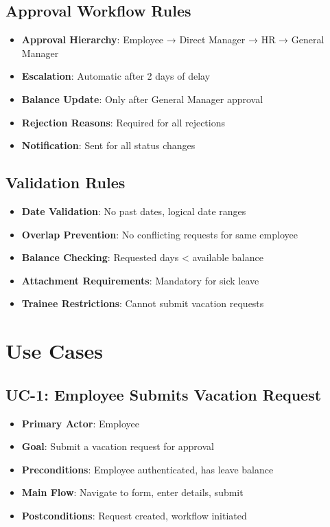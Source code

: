 \documentclass[12pt,a4paper]{article}
\begin{document}
\subsection{Approval Workflow Rules}
\begin{itemize}
    \item \textbf{Approval Hierarchy}: Employee → Direct Manager → HR → General Manager
    \item \textbf{Escalation}: Automatic after 2 days of delay
    \item \textbf{Balance Update}: Only after General Manager approval
    \item \textbf{Rejection Reasons}: Required for all rejections
    \item \textbf{Notification}: Sent for all status changes
\end{itemize}

\subsection{Validation Rules}
\begin{itemize}
    \item \textbf{Date Validation}: No past dates, logical date ranges
    \item \textbf{Overlap Prevention}: No conflicting requests for same employee
    \item \textbf{Balance Checking}: Requested days < available balance
    \item \textbf{Attachment Requirements}: Mandatory for sick leave
    \item \textbf{Trainee Restrictions}: Cannot submit vacation requests
\end{itemize}

\section{Use Cases}

\subsection{UC-1: Employee Submits Vacation Request}
\begin{itemize}
    \item \textbf{Primary Actor}: Employee
    \item \textbf{Goal}: Submit a vacation request for approval
    \item \textbf{Preconditions}: Employee authenticated, has leave balance
    \item \textbf{Main Flow}: Navigate to form, enter details, submit
    \item \textbf{Postconditions}: Request created, workflow initiated
\end{itemize}
\end{document}
